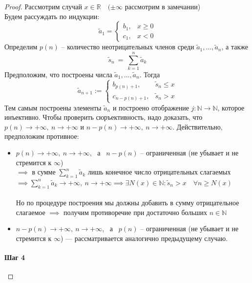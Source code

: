 \documentclass[11pt]{article}
\begin{document}
\begin{proof}
  Рассмотрим случай $x \in \mathbb{R} \quad (\pm \infty$ рассмотрим в замечании) \\
  Будем рассуждать по индукции:
  \[\widetilde{a}_1 = 
  \begin{cases}
    b_1, & x \geq 0 \\
    c_1, & x < 0
  \end{cases}\]
  Определим $p(n)$ -- количество неотрицательных членов среди $\widetilde{a}_1, 
  \ldots, \widetilde{a}_n$, а также 
  \[\widetilde{s}_n \ = \ \sum_{k = 1}^{n} \widetilde{a}_k\]
  Предположим, что построены числа $\widetilde{a}_1, \ldots, \widetilde{a}_n$.
  Тогда \[\widetilde{a}_{n + 1} := 
  \begin{cases}
    b_{p(n) + 1}, & \widetilde{s}_n \leq x \\
    c_{n - p(n) + 1}, & \widetilde{s}_n > x
  \end{cases}\]
  Тем самым построены элементы $\widetilde{a}_n$ и построено отображение 
  $j \colon \mathbb{N} \to \mathbb{N}$, которое инъективно. Чтобы проверить 
  сюръективность, надо доказать, что $p(n) \to + \infty, \ n \to + \infty$ 
  и $n - p(n) \to + \infty, \ n \to + \infty$. Действительно, предположим 
  противное:
  \begin{itemize}
    \item $p(n) \to + \infty, \ n \to + \infty$, \ а \ $n - p(n)$ -- 
    ограниченная (не убывает и не стремится к $\infty$) \\
    $\implies$ в сумме $\displaystyle \sum_{k = 1}^{n} \widetilde{a}_k$ лишь 
    конечное число отрицательных слагаемых \\
    $\implies \displaystyle \sum_{k = 1}^{n} \widetilde{a}_k \to + \infty, 
    \ n \to + \infty \implies \exists N(x) \in \mathbb{N}: \widetilde{s}_n 
    > x \quad \forall n \geq N(x)$ \\ \\
    Но по процедуре построения мы должны добавить в сумму отрицательное 
    слагаемое $\implies$ получим противоречие при достаточно больших $n \in 
    \mathbb{N}$
    \item $n - p(n) \to + \infty, \ n \to + \infty$, \ а \ $p(n)$ -- 
    ограниченная (не убывает и не стремится к $\infty$) --- рассматривается 
    аналогично предыдущему случаю.
  \end{itemize}

  \paragraph{Шаг 4}


\end{proof}
\end{document}
